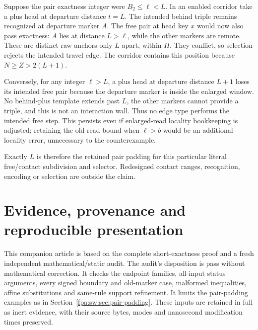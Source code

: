 \documentclass[11pt,a4paper]{article}
\numberwithin{equation}{section}
\begin{document}
Suppose the pair exactness integer were $B_2\le\ell<L$. In an enabled corridor take a plus head at departure distance $t=L$. The intended behind triple remains recognized at departure marker $A$. The free pair at head key $x$ would now also pass exactness: $A$ lies at distance $L>\ell$, while the other markers are remote. These are distinct raw anchors only $L$ apart, within $H$. They conflict, so selection rejects the intended travel edge. The corridor contains this position because $N\ge Z>2(L+1)$.

Conversely, for any integer $\ell>L$, a plus head at departure distance $L+1$ loses its intended free pair because the departure marker is inside the enlarged window. No behind-plus template extends past $L$, the other markers cannot provide a triple, and this is not an interaction wall. Thus no edge type performs the intended free step. This persists even if enlarged-read locality bookkeeping is adjusted; retaining the old read bound when $\ell>b$ would be an additional locality error, unnecessary to the counterexample.

Exactly $L$ is therefore the retained pair padding for this particular literal free/contact subdivision and selector. Redesigned contact ranges, recognition, encoding or selection are outside the claim.
\section{Evidence, provenance and reproducible presentation}\label{fpa:sw:sec:provenance}
This companion article is based on the complete short-exactness proof and a fresh independent mathematical/static audit. The audit's disposition is pass without mathematical correction. It checks the endpoint families, all-input status arguments, every signed boundary and old-marker case, malformed inequalities, affine substitutions and same-rule support refinement. It limits the pair-padding examples as in Section~\ref{fpa:sw:sec:pair-padding}. These inputs are retained in full as inert evidence, with their source bytes, modes and nanosecond modification times preserved.
\end{document}
